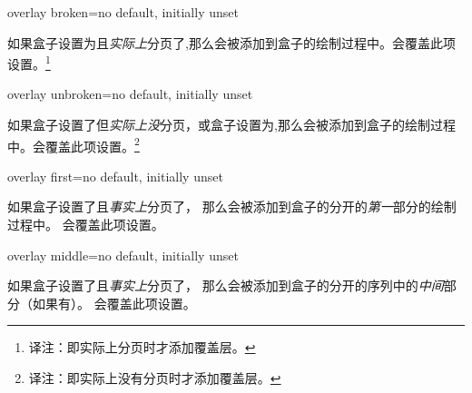 \begin{docTcbKey}{overlay broken}{=}{no default, initially unset}

如果盒子设置为且\emph{实际上}分页了,那么会被添加到盒子的绘制过程中。会覆盖此项设置。\footnote{译注：即实际上分页时才添加覆盖层。}
\end{docTcbKey}

\begin{docTcbKey}{overlay unbroken}{=}{no default, initially unset}

如果盒子设置了但\emph{实际上没}分页，或盒子设置为,那么会被添加到盒子的绘制过程中。会覆盖此项设置。\footnote{译注：即实际上没有分页时才添加覆盖层。}
\end{docTcbKey}



\begin{docTcbKey}{overlay first}{=}{no default, initially unset}

如果盒子设置了且\emph{事实上}分页了，
那么会被添加到盒子的分开的\emph{第一}部分的绘制过程中。
会覆盖此项设置。
\end{docTcbKey}

\begin{docTcbKey}{overlay middle}{=}{no default, initially unset}

如果盒子设置了且\emph{事实上}分页了，
那么会被添加到盒子的分开的序列中的\emph{中间}部分（如果有）。 会覆盖此项设置。
\end{docTcbKey}

